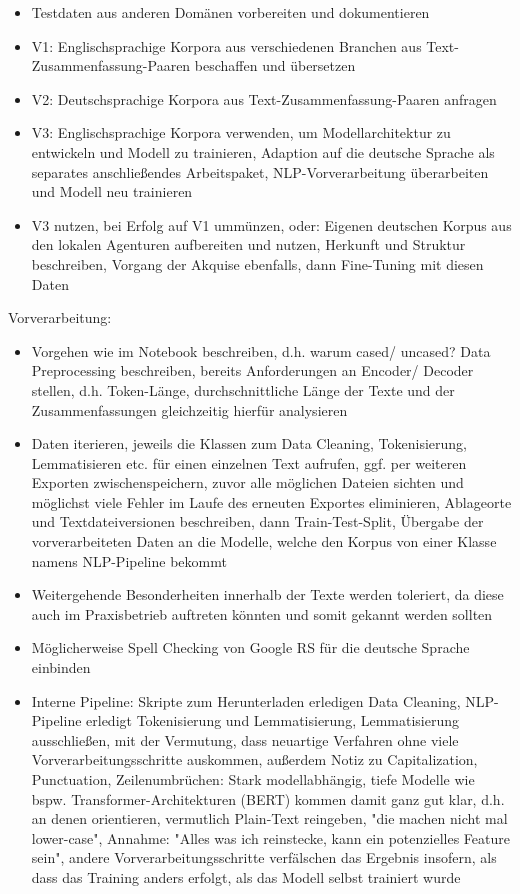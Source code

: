 \begin{itemize}
	\item Testdaten aus anderen Domänen vorbereiten und dokumentieren
	\item V1: Englischsprachige Korpora aus verschiedenen Branchen aus Text-Zusammenfassung-Paaren beschaffen und übersetzen
	\item V2: Deutschsprachige Korpora aus Text-Zusammenfassung-Paaren anfragen
	\item V3: Englischsprachige Korpora verwenden, um Modellarchitektur zu entwickeln und Modell zu trainieren, Adaption auf die deutsche Sprache als separates anschließendes Arbeitspaket, NLP-Vorverarbeitung überarbeiten und Modell neu trainieren
	\item V3 nutzen, bei Erfolg auf V1 ummünzen, oder: Eigenen deutschen Korpus aus den lokalen Agenturen aufbereiten und nutzen, Herkunft und Struktur beschreiben, Vorgang der Akquise ebenfalls, dann Fine-Tuning mit diesen Daten
\end{itemize}

Vorverarbeitung:
\begin{itemize}
	\item Vorgehen wie im Notebook beschreiben, d.h. warum cased/ uncased? Data Preprocessing beschreiben, bereits Anforderungen an Encoder/ Decoder stellen, d.h. Token-Länge, durchschnittliche Länge der Texte und der Zusammenfassungen gleichzeitig hierfür analysieren
	\item Daten iterieren, jeweils die Klassen zum Data Cleaning, Tokenisierung, Lemmatisieren etc. für einen einzelnen Text aufrufen, ggf. per weiteren Exporten zwischenspeichern, zuvor alle möglichen Dateien sichten und möglichst viele Fehler im Laufe des erneuten Exportes eliminieren, Ablageorte und Textdateiversionen beschreiben, dann Train-Test-Split, Übergabe der vorverarbeiteten Daten an die Modelle, welche den Korpus von einer Klasse namens NLP-Pipeline bekommt
	\item Weitergehende Besonderheiten innerhalb der Texte werden toleriert, da diese auch im Praxisbetrieb auftreten könnten und somit gekannt werden sollten
	\item Möglicherweise Spell Checking von Google RS für die deutsche Sprache einbinden
	\item Interne Pipeline: Skripte zum Herunterladen erledigen Data Cleaning, NLP-Pipeline erledigt Tokenisierung und Lemmatisierung, Lemmatisierung ausschließen, mit der Vermutung, dass neuartige Verfahren ohne viele Vorverarbeitungsschritte auskommen, außerdem Notiz zu Capitalization, Punctuation, Zeilenumbrüchen: Stark modellabhängig, tiefe Modelle wie bspw. Transformer-Architekturen (BERT) kommen damit ganz gut klar, d.h. an denen orientieren, vermutlich Plain-Text reingeben, "die machen nicht mal lower-case", Annahme: "Alles was ich reinstecke, kann ein potenzielles Feature sein", andere Vorverarbeitungsschritte verfälschen das Ergebnis insofern, als dass das Training anders erfolgt, als das Modell selbst trainiert wurde
\end{itemize}

